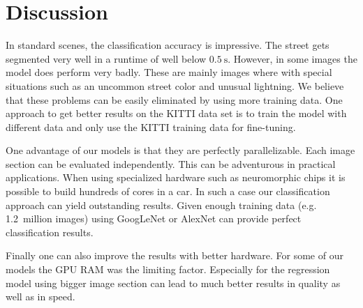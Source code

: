 
\section{Discussion}\label{sec:discussion}

In standard scenes, the classification accuracy is impressive. The street gets
segmented very well in a runtime of well below  $\SI{0.5}{\second}$. However,
in some images the model does perform very badly. These are mainly images where
with special situations such as an uncommon street color and unusual lightning.
We believe that these problems can be easily eliminated by using more training
data. One approach to get better results on the KITTI data set is to train the
model with different data and only use the KITTI training data for fine-tuning.

One advantage of our models is that they are perfectly parallelizable. Each
image section can be evaluated independently. This can be adventurous in
practical applications. When using specialized hardware such as neuromorphic
chips it is possible to build hundreds of cores in a car. In such a case our
classification approach can yield outstanding results. Given enough training
data (e.g. 1.2~million images) using GoogLeNet or AlexNet can provide perfect
classification results.

Finally one can also improve the results with better hardware. For some of our
models the \gls{GPU} RAM was the limiting factor. Especially for the regression
model using bigger image section can lead to much better results in quality as
well as in speed.

